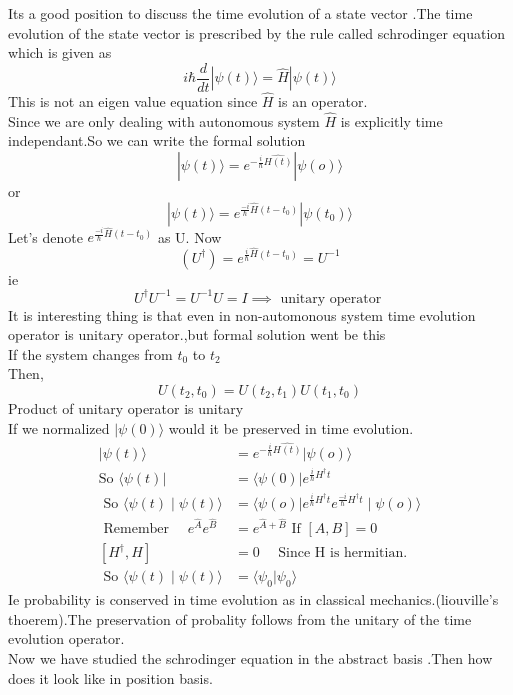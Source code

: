 	Its a good position to discuss the time evolution of a state vector .The time evolution of the state vector is prescribed by the rule called schrodinger equation which is given as\\
$$i\hbar \frac{d}{dt}|\psi(t)\rangle =\hat{H}|\psi(t)\rangle $$
This is not an eigen value equation since $\hat{H}$ is an operator.\\
Since we are only dealing with autonomous system $\hat{H}$ is explicitly time independant.So we can write the formal solution \\
$$|\psi(t) \rangle =e^{-\frac{i}{\hbar}\hat{H(t)}} |\psi(o)\rangle $$
or $$|\psi(t) \rangle =e^{\frac{-i}{\hbar}\hat{H}(t-t_0)} |\psi(t_0)\rangle$$
Let's denote $e^{\frac{-i}{\hbar}\hat{H}(t-t_0)}$ as U.
Now $$(U^{\dagger})=e^{\frac{i}{\hbar}\hat{H}(t-t_0)}=U^{-1}$$
ie $$U^{\dagger}U^{-1}=U^{-1}U=I\implies \text{ unitary operator }$$
It is interesting thing is that even in non-automonous system time evolution operator is unitary operator.,but formal solution went be this \\
If the system changes from $t_0$ to $  t_2$\\
Then, $$U(t_2,t_0)=U(t_2,t_1)U(t_1,t_0)$$
Product of unitary operator is unitary \\
If we normalized $|\psi(0)\rangle$ would it be preserved in time evolution.
$$
\begin{aligned}
	|\psi(t) \rangle &=e^{-\frac{i}{\hbar}\hat{H(t)}} |\psi(o)\rangle \\
	\text{So }\langle \psi(t)|&=\langle \psi(0)|e^{\frac{i}{\hbar}
		H^{\dagger}t}\\
\text{	So }\langle \psi(t)\mid \psi(t)\rangle&=\langle \psi(o)|e^{\frac{i}{\hbar}H^{\dagger}t}e^{\frac{-i}{\hbar}H^{\dagger}t}\mid \psi(o)\rangle\\
\text{	Remember }\quad e^{\hat{A}}e^{\hat{B}}&=e^{\hat{A}+\hat{B}}
\text{	If }\left[ A,B\right] =0\\
	 \left[ H^{\dagger},H\right] &=0 \quad\text{ Since H is hermitian.}\\
\text{	So }\langle \psi(t)\mid \psi(t)\rangle&=\langle \psi_{0}|\psi_{0}\rangle
\end{aligned}
$$
Ie probability is conserved in time evolution as in classical mechanics.(liouville's thoerem).The preservation of probality follows from the unitary of the time evolution operator.\\
Now we have studied the schrodinger equation in the abstract basis .Then how does it look like in position basis.\\
